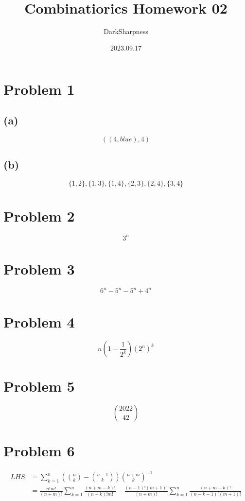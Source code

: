 \documentclass[fontset=windows]{article}
\title{\heiti\zihao{2} Combinatiorics Homework 02}
\author{DarkSharpness}
\date{2023.09.17}
\begin{document}
	\maketitle

\tableofcontents


\section*{Problem 1} 
\subsection*{(a)}
    $$((4,blue),4)$$
\subsection*{(b)}
    $$\{1,2\},\{1,3\},\{1,4\},\{2,3\},\{2,4\},\{3,4\}$$


\section*{Problem 2} $$3^n$$

\section*{Problem 3} $$6^n-5^n-5^n+4^n$$

\section*{Problem 4} $$n(1-\frac 1 {2^k}) (2^n)^k$$

\section*{Problem 5} $${2022} \choose {42}$$

\section*{Problem 6}

$$
\begin{aligned}
LHS &= \sum_{k=1}^{n}{ ( {{n} \choose {k}} - {{n - 1} \choose {k}} )  {  {n + m} \choose {k} }^{-1}} \\
    &= \frac{n!m!}{(n + m)!}  \sum_{k=1}^{n} \frac{(n + m - k)!} {(n - k)! m!}
        - \frac{(n - 1)!(m + 1)!}{(n + m)!} \sum_{k=1}^n \frac {(n + m - k)!} {(n - k - 1)!(m + 1)!} \\
\end{aligned}
$$
\end{document}
